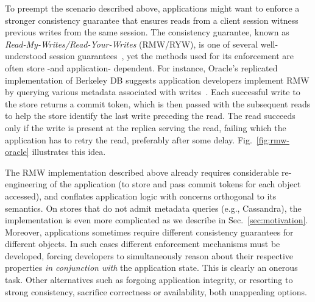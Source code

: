 To preempt the scenario described above, applications might want to
enforce a stronger consistency guarantee that ensures reads from a
client session witness previous writes from the same session. The
consistency guarantee, known as \emph{Read-My-Writes/Read-Your-Writes}
(RMW/RYW), is one of several well-understood session
guarantees~\cite{terry-pdis94}, yet the methods used for its
enforcement are often store -and application- dependent. For instance,
Oracle's replicated implementation of Berkeley DB suggests application
developers implement RMW by querying various metadata associated with
writes~\cite{oracle-ryw}.  Each successful write to the store returns
a commit token, which is then passed with the subsequent reads to help
the store identify the last write preceding the read. The read
succeeds only if the write is present at the replica serving the read,
failing which the application has to retry the read, preferably after
some delay.  Fig.~\ref{fig:rmw-oracle} illustrates this idea.

The RMW implementation described above already requires considerable
re-engineering of the application (to store and pass commit tokens for
each object accessed), and conflates application logic with concerns
orthogonal to its semantics. On stores that do not admit metadata
queries (e.g., Cassandra), the implementation is even more complicated
as we describe in Sec.~\ref{sec:motivation}. Moreover, applications
sometimes require different consistency guarantees for different
objects.  In such cases different enforcement mechanisms must be
developed, forcing developers to simultaneously reason about their
respective properties \emph{in conjunction with} the application
state. This is clearly an onerous task.  Other alternatives such as
forgoing application integrity, or resorting to strong consistency,
sacrifice correctness or availability, both unappealing options.

